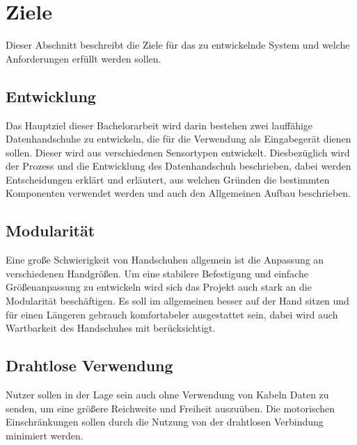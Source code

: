 \chapter{Ziele}
Dieser Abschnitt beschreibt die Ziele für das zu entwickelnde System und welche Anforderungen erfüllt werden sollen. 

\section{Entwicklung}
Das Hauptziel dieser Bachelorarbeit wird darin bestehen zwei lauffähige Datenhandschuhe zu entwickeln, die für die Verwendung als Eingabegerät dienen sollen. Dieser wird aus verschiedenen Sensortypen entwickelt. Diesbezüglich wird der Prozess und die Entwicklung des Datenhandschuh beschrieben, dabei werden Entscheidungen erklärt und erläutert, aus welchen Gründen die bestimmten Komponenten verwendet werden und auch den Allgemeinen Aufbau beschrieben. 

\section{Modularität}
Eine große Schwierigkeit von Handschuhen allgemein ist die Anpassung an verschiedenen Handgrößen. Um eine stabilere Befestigung und einfache Größenanpassung zu entwickeln wird sich das Projekt auch stark an die Modularität beschäftigen. 
Es soll im allgemeinen besser auf der Hand sitzen und für einen Längeren gebrauch komfortabeler ausgestattet sein, dabei wird auch Wartbarkeit des Handschuhes mit berücksichtigt.

\section{Drahtlose Verwendung}
Nutzer sollen in der Lage sein auch ohne Verwendung von Kabeln Daten zu senden, um eine größere Reichweite und Freiheit auszuüben. Die motorischen Einschränkungen sollen durch die Nutzung von der drahtlosen Verbindung minimiert werden.

